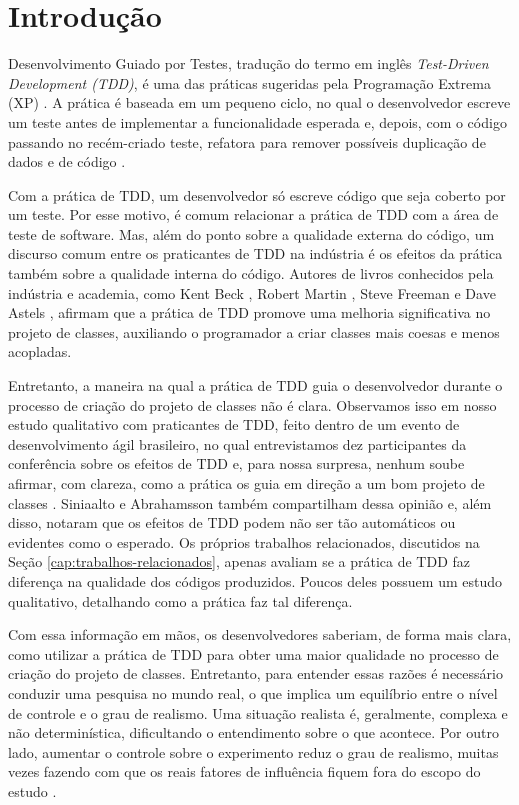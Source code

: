 \chapter{Introdução}
\label{cap:introducao}

Desenvolvimento Guiado por Testes, tradução do termo
em inglês \textit{Test-Driven Development (TDD)},
é uma das práticas sugeridas pela Programação
Extrema (XP) \cite{XPExplained}. A prática é baseada em um pequeno ciclo, 
no qual o desenvolvedor escreve um teste antes
de implementar a funcionalidade esperada e, depois, com o código
passando no recém-criado teste, refatora para 
remover possíveis duplicação de dados e de código \cite{TDDByExample}.

Com a prática de TDD, um desenvolvedor só escreve código
que seja coberto por um teste. Por esse motivo, é comum relacionar a prática
de TDD com a área de teste de software. Mas, além do ponto sobre
a qualidade externa do código, um discurso comum entre os praticantes de TDD
na indústria é os efeitos da prática também sobre a qualidade interna do código.
Autores de livros conhecidos pela indústria e academia, como
Kent Beck \cite{TDDByExample}, Robert Martin \cite{agile-ppp}, 
Steve Freeman \cite{GOOS} e Dave Astels \cite{astels-tdd}, afirmam que a prática de TDD
promove uma melhoria significativa no projeto de classes, auxiliando
o programador a criar classes mais coesas e menos acopladas.

Entretanto, a maneira na qual a prática de TDD guia o desenvolvedor
durante o processo de criação do projeto de classes não é clara. Observamos
isso em nosso estudo qualitativo com praticantes de TDD, feito dentro de um
evento de desenvolvimento ágil brasileiro, no qual entrevistamos dez
participantes da conferência sobre os efeitos de TDD e, para nossa surpresa,
nenhum soube afirmar, com clareza, como a prática os guia em direção
a um bom projeto de classes \cite{aniche-wbma}.
Siniaalto e Abrahamsson \cite{alarming-results} também
compartilham dessa opinião e, além disso, notaram que os efeitos de TDD podem 
não ser tão automáticos ou evidentes como o esperado.
Os próprios trabalhos relacionados, discutidos na Seção \ref{cap:trabalhos-relacionados},
apenas avaliam se a prática de TDD faz diferença na qualidade dos códigos produzidos.
Poucos deles possuem um estudo qualitativo, detalhando como a prática
faz tal diferença.

Com essa informação em mãos, os desenvolvedores saberiam, de forma mais clara,
como utilizar a prática de TDD para obter uma maior qualidade no processo de criação
do projeto de classes. Entretanto, para entender essas razões é necessário
conduzir uma pesquisa no mundo real, o que  
implica um equilíbrio entre o nível de controle
e o grau de realismo. Uma situação realista é, geralmente, complexa e 
não determinística, dificultando o entendimento sobre o que acontece. Por outro
lado, aumentar o controle sobre o experimento reduz o grau de realismo, muitas
vezes fazendo com que os reais fatores de influência fiquem fora do escopo do 
estudo \cite{guidelines-case-study}.

